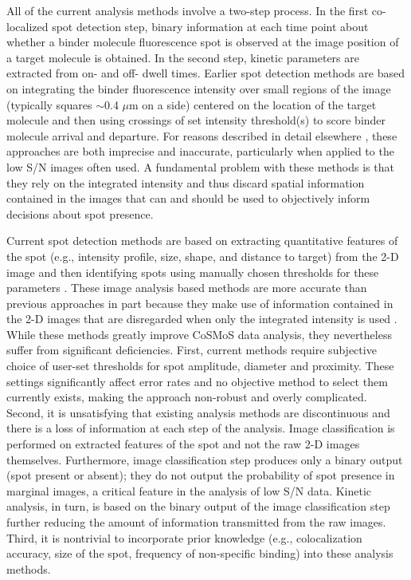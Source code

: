 All of the current analysis methods involve a two-step process. In the first co-localized spot detection step, binary information at each time point about whether a binder molecule fluorescence spot is observed at the image position of a target molecule is obtained. In the second step, kinetic parameters are extracted from on- and off- dwell times. Earlier spot detection methods are based on integrating the binder fluorescence intensity over small regions of the image (typically squares $\sim$0.4 $\mu$m on a side) centered on the location of the target molecule and then using crossings of set intensity threshold(s) to score binder molecule arrival and departure. For reasons described in detail elsewhere \citep{friedman_cosmos_analysis_2015}, these approaches are both imprecise and inaccurate, particularly when applied to the low S/N images often used. A fundamental problem with these methods is that they rely on the integrated intensity and thus discard spatial information contained in the images that can and should be used to objectively inform decisions about spot presence.

Current spot detection methods are based on extracting quantitative features of the spot (e.g., intensity profile, size, shape, and distance to target) from the 2-D image and then identifying spots using manually chosen thresholds for these parameters \citep{friedman_cosmos_analysis_2015, smith_automated_2019}. These image analysis based methods are more accurate than previous approaches in part because they make use of information contained in the 2-D images that are disregarded when only the integrated intensity is used \citep{friedman_cosmos_analysis_2015}. While these methods greatly improve CoSMoS data analysis, they nevertheless suffer from significant deficiencies. First, current methods require subjective choice of user-set thresholds for spot amplitude, diameter and proximity. These settings significantly affect error rates and no objective method to select them currently exists, making the approach non-robust and overly complicated. Second, it is unsatisfying that existing analysis methods are discontinuous and there is a loss of information at each step of the analysis. Image classification is performed on extracted features of the spot and not the raw 2-D images themselves. Furthermore, image classification step produces only a binary output (spot present or absent); they do not output the probability of spot presence in marginal images, a critical feature in the analysis of low S/N data. Kinetic analysis, in turn, is based on the binary output of the image classification step further reducing the amount of information transmitted from the raw images. Third, it is nontrivial to incorporate prior knowledge (e.g., colocalization accuracy, size of the spot, frequency of non-specific binding) into these analysis methods.

